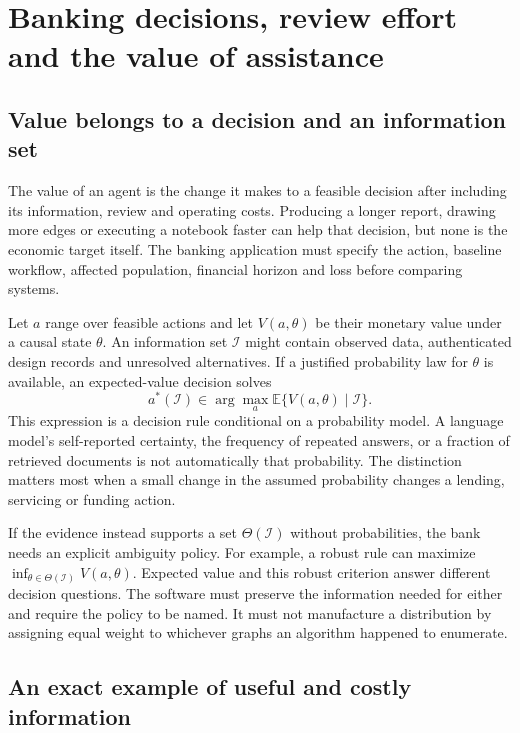 \chapter{Banking decisions, review effort and the value of assistance}
\label{la:economics}

\section{Value belongs to a decision and an information set}

The value of an agent is the change it makes to a feasible decision after
including its information, review and operating costs. Producing a longer
report, drawing more edges or executing a notebook faster can help that
decision, but none is the economic target itself. The banking application must
specify the action, baseline workflow, affected population, financial horizon
and loss before comparing systems.

Let $a$ range over feasible actions and let $V(a,\theta)$ be their monetary
value under a causal state $\theta$. An information set $\mathcal I$ might
contain observed data, authenticated design records and unresolved alternatives.
If a justified probability law for $\theta$ is available, an expected-value
decision solves
\[
 a^*(\mathcal I)\in\arg\max_a
       \mathbb E\{V(a,\theta)\mid\mathcal I\}.
\]
This expression is a decision rule conditional on a probability model. A
language model's self-reported certainty, the frequency of repeated answers,
or a fraction of retrieved documents is not automatically that probability.
The distinction matters most when a small change in the assumed probability
changes a lending, servicing or funding action.

If the evidence instead supports a set $\Theta(\mathcal I)$ without probabilities,
the bank needs an explicit ambiguity policy. For example, a robust rule can
maximize $\inf_{\theta\in\Theta(\mathcal I)}V(a,\theta)$. Expected value and this
robust criterion answer different decision questions. The software must
preserve the information needed for either and require the policy to be named.
It must not manufacture a distribution by assigning equal weight to whichever
graphs an algorithm happened to enumerate.

\section{An exact example of useful and costly information}

